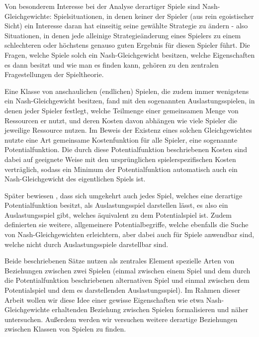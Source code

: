 \documentclass[a4paper,ngerman,11pt,bibliography=totoc]{scrartcl}
\theoremstyle{definition}
\theoremstyle{plain}
\theoremstyle{remark}
\begin{document}
Von besonderem Interesse bei der Analyse derartiger Spiele sind Nash-Gleichgewichte: Spielsituationen, in denen keiner der Spieler (aus rein egoistischer Sicht) ein Interesse daran hat einseitig seine gewählte Strategie zu ändern - also Situationen, in denen jede alleinige Strategieänderung eines Spielers zu einem schlechteren oder höchstens genauso guten Ergebnis für diesen Spieler führt. Die Fragen, welche Spiele solch ein Nash-Gleichgewicht besitzen, welche Eigenschaften es dann besitzt und wie man es finden kann, gehören zu den zentralen Fragestellungen der Spieltheorie.

Eine Klasse von anschaulichen (endlichen) Spielen, die zudem immer wenigstens ein Nash-Gleichgewicht besitzen, fand \citeauthor{RosenthalPotential} mit den sogenannten Auslastungsspielen, in denen jeder Spieler festlegt, welche Teilmenge einer gemeinsamen Menge von Ressourcen er nutzt, und deren Kosten davon abhängen wie viele Spieler die jeweilige Ressource nutzen. Im Beweis der Existenz eines solchen Gleichgewichtes nutzte \citeauthor{RosenthalPotential} eine Art gemeinsame Kostenfunktion für alle Spieler, eine sogenannte Potentialfunktion. Die durch diese Potentialfunktion beschriebenen Kosten sind dabei auf geeignete Weise mit den ursprünglichen spielerspezifischen Kosten verträglich, sodass ein Minimum der Potentialfunktion automatisch auch ein Nash-Gleichgewicht des eigentlichen Spiels ist.

Später bewiesen \citeauthor{MonShap}, dass sich umgekehrt auch jedes Spiel, welches eine derartige Potentialfunktion besitzt, als Auslastungsspiel darstellen lässt, es also ein Auslastungsspiel gibt, welches äquivalent zu dem Potentialspiel ist. Zudem definierten sie weitere, allgemeinere Potentialbegriffe, welche ebenfalls die Suche von Nash-Gleichgewichten erleichtern, aber dabei auch für Spiele anwendbar sind, welche nicht durch Auslastungsspiele darstellbar sind. 

Beide beschriebenen Sätze nutzen als zentrales Element spezielle Arten von Beziehungen zwischen zwei Spielen (einmal zwischen einem Spiel und dem durch die Potentialfunktion beschriebenen alternativen Spiel und einmal zwischen dem Potentialspiel und dem es darstellenden Auslastungsspiel). Im Rahmen dieser Arbeit wollen wir diese Idee einer gewisse Eigenschaften wie etwa Nash-Gleichgewichte erhaltenden Beziehung zwischen Spielen formalisieren und näher untersuchen. Außerdem werden wir versuchen weitere derartige Beziehungen zwischen Klassen von Spielen zu finden.
\end{document}
